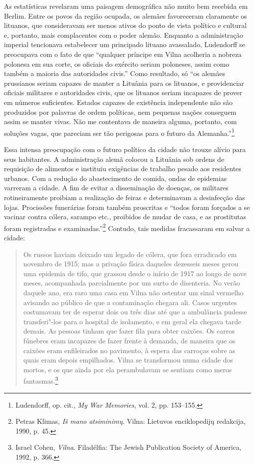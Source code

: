 As estatísticas revelaram uma paisagem demográfica não muito bem
recebida em Berlim. Entre os povos da região ocupada, os alemães
favoreceram claramente os lituanos, que consideravam ser menos ativos do
ponto de vista político e cultural e, portanto, mais complacentes com o
poder alemão. Enquanto a administração imperial tencionava estabelecer
um principado lituano avassalado, Ludendorff se preocupava com o fato de
que ``qualquer príncipe em Vilna acolheria a nobreza polonesa em sua
corte, os oficiais do exército seriam poloneses, assim como também a
maioria das autoridades civis.'' Como resultado, só ``os alemães
prussianos seriam capazes de manter a Lituânia para os lituanos, e
providenciar oficiais militares e autoridades civis, que os lituanos
seriam incapazes de prover em números suficientes. Estados capazes de
existência independente não são produzidos por palavras de ordem
políticas, nem pequenas nações conseguem assim se manter vivas. Não me
contentava de maneira alguma, portanto, com soluções vagas, que pareciam
ser tão perigosas para o futuro da Alemanha.''\footnote{Ludendorff, op. cit., \textit{My War Memories}, vol. 2, pp. 153--155.}

Essa intensa preocupação com o futuro político da cidade não trouxe
alívio para seus habitantes. A administração alemã colocou a Lituânia
sob ordens de requisição de alimentos e instituiu exigências de trabalho
pesado aos residentes urbanos. Com a redução do abastecimento de comida,
ondas de epidemias varreram a cidade. A fim de evitar a disseminação de
doenças, os militares rotineiramente proibiam a realização de feiras e
determinavam a desinfecção das lojas. Procissões funerárias foram também
proscritas e ``todos foram forçados a se vacinar contra cólera, sarampo
etc., proibidos de mudar de casa, e as prostitutas foram registradas e
examinadas.''\footnote{Petras Klimas, \textit{Iš mano atsiminimų}. Vilna: Lietuvos enciklopedijų redakcija, 1990, p. 45.} Contudo, tais medidas fracassaram em salvar a cidade:

\begin{quote}
Os russos haviam deixado um legado de cólera, que fora erradicado em
novembro de 1915; mas a privação física daqueles dezesseis meses gerou
uma epidemia de tifo, que grassou desde o início de 1917 ao longo de
nove meses, acompanhada parcialmente por um surto de disenteria. No
verão daquele ano, era raro uma casa em Vilna não ostentar um sinal
vermelho avisando ao público de que a contaminação chegara ali. Casos
urgentes costumavam ter de esperar dois ou três dias até que a
ambulância pudesse transferi"-los para o hospital de isolamento, e em
geral ela chegava tarde demais. As pessoas tinham que fazer fila para
obter caixões. Os carros fúnebres eram incapazes de fazer frente à
demanda, de maneira que os caixões eram enfileirados no pavimento, à
espera das carroças sobre as quais eram depois empilhados. Vilna se
transformou numa cidade dos mortos, e os que ainda por ela perambulavam
se sentiam como meros fantasmas.\footnote{Israel Cohen, \textit{Vilna}. Filadélfia: The Jewish Publication Society of America, 1992, p. 366.} 
\end{quote}

